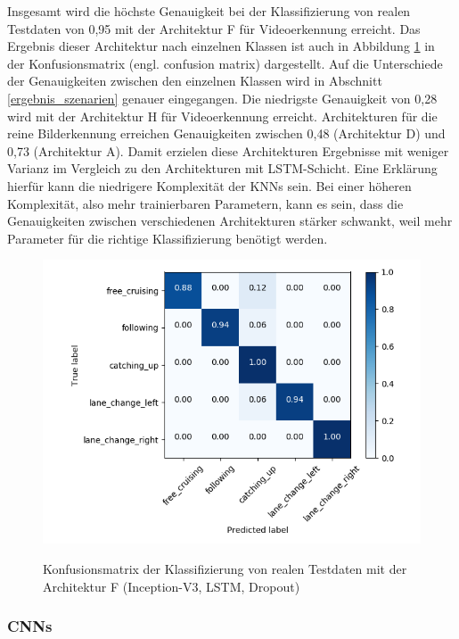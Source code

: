 Insgesamt wird die höchste Genauigkeit bei der Klassifizierung von realen Testdaten von 0,95 mit der Architektur F für Videoerkennung erreicht. Das Ergebnis dieser Architektur nach einzelnen Klassen ist auch in Abbildung \ref{fig_cm_v3_lstm_d_real} in der Konfusionsmatrix (engl. confusion matrix) dargestellt. Auf die Unterschiede der Genauigkeiten zwischen den einzelnen Klassen wird in Abschnitt \ref{ergebnis_szenarien} genauer eingegangen. Die niedrigste Genauigkeit von 0,28 wird mit der Architektur H für Videoerkennung erreicht. Architekturen für die reine Bilderkennung erreichen Genauigkeiten zwischen 0,48 (Architektur D) und 0,73 (Architektur A). Damit erzielen diese Architekturen Ergebnisse mit weniger Varianz im Vergleich zu den Architekturen mit \ac{LSTM}-Schicht. Eine Erklärung hierfür kann die niedrigere Komplexität der \acp{KNN} sein. Bei einer höheren Komplexität, also mehr trainierbaren Parametern, kann es sein, dass die Genauigkeiten zwischen verschiedenen Architekturen stärker schwankt, weil mehr Parameter für die richtige Klassifizierung benötigt werden.

\begin{figure}[h]
\centering
{\includegraphics[scale=0.7]{images/cm_v3_lstm_d_real.png}}
\caption{Konfusionsmatrix der Klassifizierung von realen Testdaten mit der Architektur F (Inception-V3, \ac{LSTM}, Dropout)}
\label{fig_cm_v3_lstm_d_real}
\end{figure}

\subsubsection{\aclp{CNN}}


